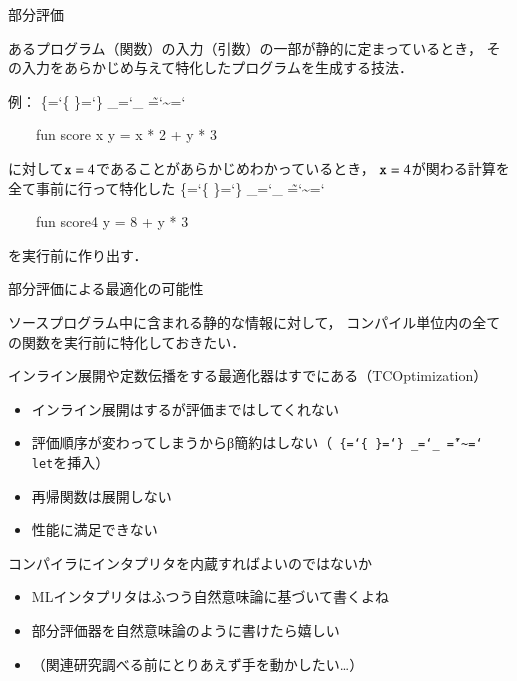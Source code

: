 \documentclass[aspectratio=169,t,dvipdfmx,12pt]{beamer}
\newcommand\codestyle{%
  \ttfamily
  \chardef\{=`\{
  \chardef\}=`\}
  \chardef\_=`\_
  \chardef\~=`\~
  \chardef\/=`\\
  \frenchspacing}
\newcommand\code[1]{\texttt{\protect\codestyle #1}}
\newenvironment{prog}
  {\codestyle\begin{tabbing}}
  {\end{tabbing}}
\newcommand\KW[1]{{\color{KW}#1}}
\newcommand\ID[1]{{\color{ID}#1}}
\begin{document}
\begin{frame}{部分評価}

あるプログラム（関数）の入力（引数）の一部が静的に定まっているとき，
その入力をあらかじめ与えて特化したプログラムを生成する技法．

\bigskip

例：
\begin{prog}
~~~~\KW{fun} \ID{score} x y = x * 2 + y * 3
\end{prog}
に対して$\code{x} = 4$であることがあらかじめわかっているとき，
$\code{x} = 4$が関わる計算を全て事前に行って特化した
\begin{prog}
~~~~\KW{fun} \ID{score4} y = 8 + y * 3
\end{prog}
を実行前に作り出す．

\end{frame}

\begin{frame}{部分評価による最適化の可能性}

ソースプログラム中に含まれる静的な情報に対して，
コンパイル単位内の全ての関数を実行前に特化しておきたい．

\bigskip

インライン展開や定数伝播をする最適化器はすでにある（TCOptimization）
\begin{itemize}
\item インライン展開はするが評価まではしてくれない
\item 評価順序が変わってしまうからβ簡約はしない（\code{let}を挿入）
\item 再帰関数は展開しない
\item 性能に満足できない
\end{itemize}

\bigskip

コンパイラにインタプリタを内蔵すればよいのではないか
\begin{itemize}
\item MLインタプリタはふつう自然意味論に基づいて書くよね
\item 部分評価器を自然意味論のように書けたら嬉しい
\item （関連研究調べる前にとりあえず手を動かしたい…）
\end{itemize}

\end{frame}
\end{document}
